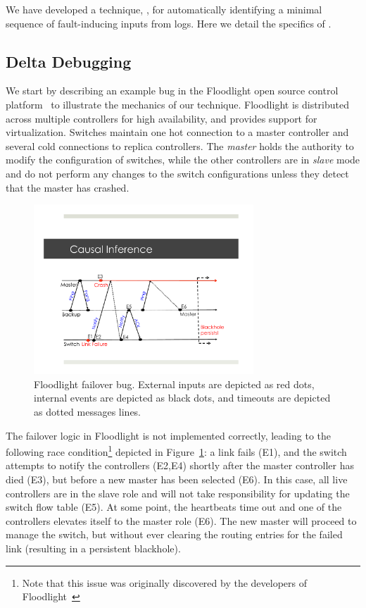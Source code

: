 We have developed a technique, \simulator, for automatically identifying
a minimal sequence of fault-inducing inputs from logs. Here we detail the specifics
of \simulator.

\subsection{Delta Debugging}
\label{subsec:algorithm}

We start by describing an example bug in the Floodlight
open source control platform~\cite{floodlight_bug} to illustrate the mechanics
of our technique. Floodlight is distributed across
multiple controllers for high availability, and provides support for
virtualization. Switches maintain one hot connection to a master controller and
several cold connections to replica controllers. The \emph{master} holds the
authority to modify the configuration of switches, while the other
controllers are in \emph{slave} mode and do not perform any changes to the
switch configurations unless they detect that the master has crashed.

\begin{figure}[t]
    \includegraphics[width=3.25in]{../diagrams/case_study/example_bug.pdf}
    \caption[]{\label{fig:example} Floodlight failover bug. External inputs
               are depicted as red dots, internal events are depicted as black
               dots, and timeouts are depicted as dotted messages lines.}
\end{figure}

The failover logic in Floodlight is not implemented correctly, leading to the
following race condition\footnote{Note that this issue was
originally discovered by the developers of Floodlight~\cite{floodlight_bug}} depicted in
Figure~\ref{fig:example}:
a link fails (E1), and the switch attempts to notify the controllers (E2,E4) shortly after the master
controller has died (E3), but before a new master has been selected (E6). In this case, all live controllers are in
the slave role and will not take responsibility for updating the switch
flow table (E5). At some point, the heartbeats time out and one of the controllers
elevates itself to the master role (E6). The new master will proceed to manage
the switch, but without ever clearing the routing entries for
the failed link (resulting in a persistent blackhole).

